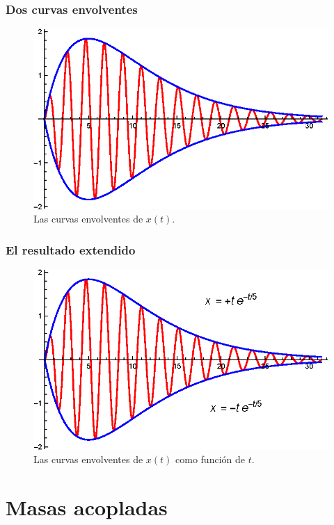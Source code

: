 \begin{frame}
\frametitle{Dos curvas envolventes}
\begin{figure}
    \centering
    \includegraphics[scale=1]{Imagenes/Ejemplo_Resonancia_04.eps}
    \caption{Las curvas envolventes de $x(t)$.}
\end{figure}
\end{frame}
\begin{frame}
\frametitle{El resultado extendido}
\begin{figure}
    \centering
    \includegraphics[scale=1]{Imagenes/Ejemplo_Resonancia_05.eps}
    \caption{Las curvas envolventes de $x(t)$ como función de $t$.}
\end{figure}
\end{frame}

\section{Masas acopladas}
